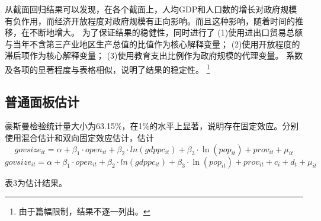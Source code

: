 \documentclass[10pt]{article}
\begin{document}
        从截面回归结果可以发现，在各个截面上，人均GDP和人口数的增长对政府规模有负作用，而经济开放程度对政府规模有正向影响。而且这种影响，随着时间的推移，在不断地增大。
        为了保证结果的稳健性，同时进行了
        (1)使用进出口贸易总额与当年不含第三产业地区生产总值的比值作为核心解释变量；
        (2)使用开放程度的滞后项作为核心解释变量；
        (3)使用教育支出比例作为政府规模的代理变量。
        系数及各项的显著程度与表格相似，说明了结果的稳定性。
    \footnote{由于篇幅限制，结果不逐一列出。}

\subsection{普通面板估计}
    豪斯曼检验统计量大小为63.15\%，在1\%的水平上显著，说明存在固定效应。分别使用混合估计和双向固定效应估计，估计
    \begin{equation}
        govsize_{it} = \alpha + \beta_{1} \cdot open_{it} + \beta_{2} \cdot ln(gdppc_{it}) + \beta_{3} \cdot \ln(pop_{it}) + prov_{it} + \mu_{it}
    \end{equation}
    \begin{equation}    
        govsize_{it} = \alpha + \beta_{1} \cdot open_{it} + \beta_{2} \cdot ln(gdppc_{it}) + \beta_{3} \cdot \ln(pop_{it}) + prov_{it} +c_{i} +d_{t} + \mu_{it}
    \end{equation}
    
    表3为估计结果。
    
\end{document}
